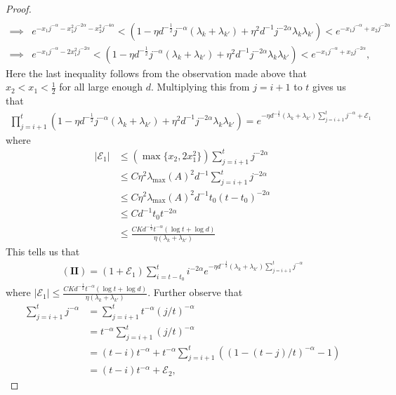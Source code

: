 \documentclass[11pt, reqno,english]{amsart}
\begin{document}
\begin{proof}
\begin{align*}
\\
\implies& e^{-x_1j^{-\alpha} - x_1^2j^{-2\alpha} - x^2_2j^{-4\alpha}} <  (1 - \eta d^{-\frac{1}{2}}j^{-\alpha} (\lambda_k + \lambda_{k'}) + \eta^2 d^{-1} j^{-2\alpha} \lambda_{k} \lambda_{k'}) < e^{-x_1j^{-\alpha} + x_2j^{-2\alpha}}
\\
\implies & e^{-x_1 j^{-\alpha} - 2x_1^2j^{-2\alpha}} < (1 - \eta d^{-\frac{1}{2}}j^{-\alpha} (\lambda_k + \lambda_{k'}) + \eta^2 d^{-1} j^{-2\alpha} \lambda_{k} \lambda_{k'}) < e^{-x_1j^{-\alpha} + x_2 j^{-2\alpha}},
\end{align*}
Here the last inequality follows from the observation made above that $x_2 < x_1 < \frac{1}{2}$ for all large enough $d$. Multiplying this from $j = i+1$ to $t$ gives us that
\begin{align*}
\prod_{j = i+1}^t (1 - \eta d^{-\frac{1}{2}}j^{-\alpha} (\lambda_k + \lambda_{k'}) + \eta^2d^{-1}j^{-2\alpha} \lambda_{k} \lambda_{k'}) = e^{-\eta d^{-\frac{1}{2}}(\lambda_k + \lambda_{k'})\sum_{j = i+1}^t j^{-\alpha} + \mathcal E_1}
\end{align*}
where 
\begin{align*}
    |\mathcal E_1| &\leq (\max\{x_2, 2x^2_1\})\sum_{j = i+1}^t j^{-2\alpha}
    \\
    &\leq C\eta^2 \lambda_{\max}(A)^2 d^{-1}\sum_{j = i+1}^t j^{-2\alpha}
    \\
    &\leq C \eta^2 \lambda_{\max}(A)^2 d^{-1} t_0 (t-t_0)^{-2\alpha}
    \\
    &\leq C d^{-1} t_0 t^{-2\alpha}
    \\
    &\leq \frac{CK d^{-\frac{1}{2}}t^{-\alpha} (\log t + \log d)}{\eta (\lambda_k + \lambda_{k'})}
\end{align*}
This tells us that
\begin{align*}
\mathbf{(II)} = (1 + \mathcal E_1)\sum_{i = t-t_0}^t i^{-2\alpha} e^{-\eta d^{-\frac{1}{2}} (\lambda_k + \lambda_{k'})\sum_{j = i+1}^t j^{-\alpha}}
\end{align*}
where $|\mathcal E_1| \leq \frac{CK d^{-\frac{1}{2}}t^{-\alpha} (\log t + \log d)}{\eta (\lambda_k + \lambda_{k'})}$. Further observe that
\begin{align*}
\sum_{j = i+1}^t j^{-\alpha} &= \sum_{j = i+1}^t t^{-\alpha}(j/t)^{-\alpha}
\\
&= t^{-\alpha} \sum_{j = i+1}^t (j/t)^{-\alpha}
\\
&= (t-i)t^{-\alpha} + t^{-\alpha}\sum_{j = i+1}^t ((1 - (t-j)/t)^{-\alpha} - 1)
\\
&= (t-i)t^{-\alpha} + \mathcal E_2,

\end{align*}
\end{proof}
\end{document}
